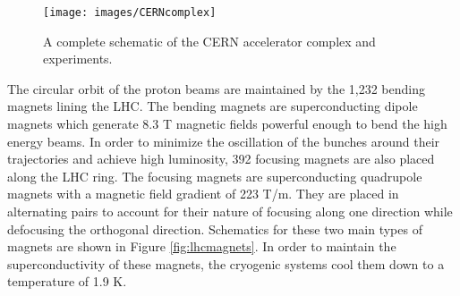 \begin{figure}[htbp]
  \centering
    \texttt{[image: images/CERNcomplex]}
    \caption[CERN Accelerator Complex]{A complete schematic of the CERN accelerator complex and experiments.\cite{CERNcomplex}}
    \label{fig:CERNcomplex}
\end{figure}

The circular orbit of the proton beams are maintained by the 1,232 bending magnets lining the LHC. The bending magnets are superconducting dipole magnets which generate 8.3 T magnetic fields powerful enough to bend the high energy beams. In order to minimize the oscillation of the bunches around their trajectories and achieve high luminosity, 392 focusing magnets are also placed along the LHC ring. The focusing magnets are superconducting quadrupole magnets with a magnetic field gradient of 223 T/m. They are placed in alternating pairs to account for their nature of focusing along one direction while defocusing the orthogonal direction. Schematics for these two main types of magnets are shown in Figure \ref{fig:lhcmagnets}. In order to maintain the superconductivity of these magnets, the cryogenic systems cool them down to a temperature of 1.9 K.

